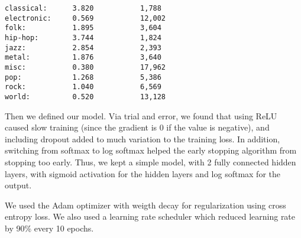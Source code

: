 \documentclass[11pt]{article}
\begin{document}
    \begin{Verbatim}[commandchars=\\\{\}]
classical:      3.820           1,788
electronic:     0.569           12,002
folk:           1.895           3,604
hip-hop:        3.744           1,824
jazz:           2.854           2,393
metal:          1.876           3,640
misc:           0.380           17,962
pop:            1.268           5,386
rock:           1.040           6,569
world:          0.520           13,128
    \end{Verbatim}

    Then we defined our model. Via trial and error, we found that using ReLU
caused slow training (since the gradient is 0 if the value is negative),
and including dropout added to much variation to the training loss. In
addition, switching from softmax to log softmax helped the early
stopping algorithm from stopping too early. Thus, we kept a simple
model, with 2 fully connected hidden layers, with sigmoid activation for
the hidden layers and log softmax for the output.

We used the Adam optimizer with weigth decay for regularization using
cross entropy loss. We also used a learning rate scheduler which reduced
learning rate by 90\% every 10 epochs.
\end{document}
